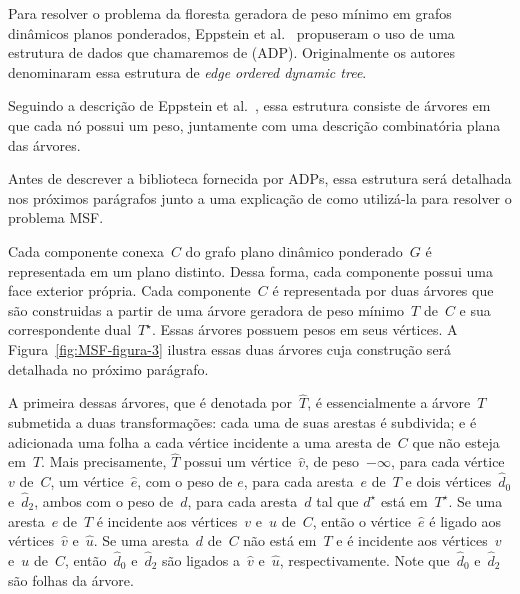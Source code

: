 Para resolver o problema da floresta geradora de peso mínimo em grafos dinâmicos planos ponderados, Eppstein et al.~\cite{EPPSTEIN-planar} propuseram o uso de uma estrutura de dados que chamaremos de  (ADP). Originalmente os autores denominaram essa estrutura de \textit{edge ordered dynamic tree}.

Seguindo a descrição de Eppstein et al.~\cite[Seção 3]{EPPSTEIN-planar}, essa estrutura consiste de árvores em que cada nó possui um peso, juntamente com uma descrição combinatória plana das árvores.

Antes de descrever a biblioteca fornecida por ADPs, essa estrutura será detalhada nos próximos parágrafos junto a uma explicação de como utilizá-la para resolver o problema MSF.

Cada componente conexa~$C$ do grafo plano dinâmico ponderado~$G$ é representada em um plano distinto.
Dessa forma, cada componente possui uma face exterior própria.
Cada componente~$C$ é representada por duas árvores que são construidas a partir de uma árvore geradora de peso mínimo~$T$ de~$C$ e sua correspondente dual~$T^\star$.
Essas árvores possuem pesos em seus vértices.
A Figura~\ref{fig:MSF-figura-3} ilustra essas duas árvores cuja construção será detalhada no próximo parágrafo.

A primeira dessas árvores, que é denotada por~$\hat T$, é essencialmente a árvore~$T$ submetida a duas transformações:
cada uma de suas arestas é subdivida; e é adicionada uma folha a cada vértice incidente a uma aresta de~$C$ que não esteja em~$T$.
Mais precisamente, $\hat T$ possui um vértice~$\hat v$, de peso~$-\infty$, para cada vértice~$v$ de~$C$, um vértice~$\hat e$, com o peso de $e$, para cada aresta~$e$ de~$T$ e dois vértices~$\hat d_0$ e~$\hat d_2$, ambos com o peso de~$d$, para cada aresta~$d$ tal que $d^\star$ está em~$T^\star$.
Se uma aresta~$e$ de~$T$ é incidente aos vértices~$v$ e~$u$ de~$C$, então o vértice~$\hat e$ é ligado aos vértices~$\hat v$ e~$\hat u$.
Se uma aresta~$d$ de~$C$ não está em~$T$ e é incidente aos vértices~$v$ e~$u$ de~$C$, então~$\hat d_0$ e~$\hat d_2$ são ligados a~$\hat v$ e~$\hat u$, respectivamente.
Note que~$\hat d_0$ e~$\hat d_2$ são folhas da árvore.

